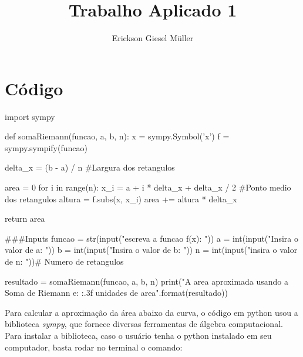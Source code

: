 \documentclass{article}
\title{Trabalho Aplicado 1}
\author{Erickson Giesel Müller}
\begin{document}

	\maketitle
	\newpage
	
	
	
	\section{Código}
	\begin{mylist}
import sympy
	
def somaRiemann(funcao, a, b, n):
	x = sympy.Symbol('x')
	f = sympy.sympify(funcao)
	
	delta_x = (b - a) / n #Largura dos retangulos
		
	area = 0
	for i in range(n):
		x_i = a + i * delta_x + delta_x / 2 #Ponto 
medio dos retangulos
		altura = f.subs(x, x_i)
		area += altura * delta_x
			
	return area

###Inputs
funcao = str(input("escreva a funcao f(x): "))
a = int(input("Insira o valor de a: "))
b = int(input("Insira o valor de b: "))
n = int(input("insira o valor de n: "))# Numero de retangulos
	
resultado = somaRiemann(funcao, a, b, n)
print("A area aproximada usando a Soma de Riemann e: {:.3f}
unidades de area".format(resultado))

	\end{mylist}
	Para calcular a aproximação da área abaixo da curva, o código em python usou a biblioteca \textit{sympy}, que fornece diversas ferramentas de álgebra computacional. Para instalar a biblioteca, caso o usuário tenha o python instalado em seu computador, basta rodar no terminal o comando:
	
\end{document}
